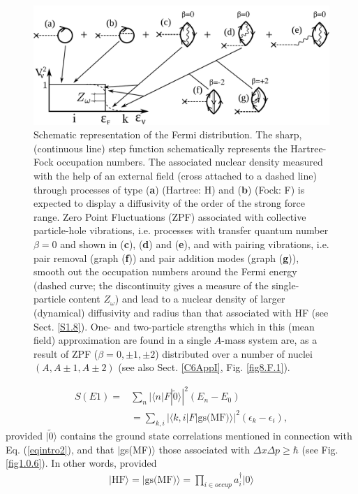 \begin{figure}
\centerline {
\includegraphics*[width=12cm]{introduccion/figs/fig1_2_2}
}
\caption{Schematic representation of the Fermi distribution. The sharp, (continuous line)  step function schematically represents the Hartree-Fock occupation numbers. The associated nuclear density measured with the help of an external field (cross attached to a dashed line) through processes of type (\textbf{a}) (Hartree: H) and (\textbf{b}) (Fock: F) is expected to display a diffusivity of the order of the strong force range. Zero Point Fluctuations (ZPF) associated with collective particle-hole vibrations, i.e. processes with transfer quantum number $\beta=0$  and shown in (\textbf{c}), (\textbf{d}) and (\textbf{e}), and with pairing vibrations, i.e. pair removal (graph (\textbf{f})) and pair addition modes (graph (\textbf{g})), smooth out the occupation numbers around the Fermi energy (dashed curve; the discontinuity gives a measure of the single-particle content $Z_\omega$) and lead to a  nuclear density of larger (dynamical) diffusivity and radius than that associated with HF (see Sect. \ref{S1.8}). One- and two-particle strengths which in this (mean field) approximation are found in a single $A$-mass system are, as a result of ZPF ($\beta=0,\pm 1, \pm 2$) distributed over a number of nuclei $(A, A\pm 1, A\pm 2)$ (see also Sect. \ref{C6AppI}, Fig. \ref{fig8.F.1}).}
\label{fig1.2.2}
\end{figure}
\begin{align}\label{eqintro6}
\nonumber S(E1)=&\sum_n |\langle n|F|\tilde 0\rangle|^2(E_n-E_0)\\
&=\sum_{k,i}|\langle k,i|F|\text{gs(MF)}\rangle|^2(\epsilon_{k}-\epsilon_i),
\end{align}
provided $|\tilde 0\rangle$ contains the ground state correlations mentioned in connection with Eq. (\ref{eqintro2}), and that $|$gs(MF)$\rangle$ those associated with $\Delta x\Delta p\geq \hbar$ (see Fig. \ref{fig1.0.6}). In other words, provided
\begin{align}
|\text{HF}\rangle=|\text{gs(MF)}\rangle=\prod_{i\in occup}a^\dagger_i |0\rangle
\end{align}

